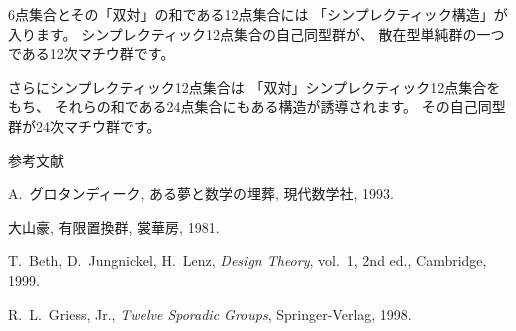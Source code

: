 \documentclass[uplatex,dvipdfmx]{jlreq}
\begin{document}
6点集合とその「双対」の和である12点集合には
「シンプレクティック構造」が入ります。
シンプレクティック12点集合の自己同型群が、
散在型単純群の一つである12次マチウ群です。

さらにシンプレクティック12点集合は
「双対」シンプレクティック12点集合をもち、
それらの和である24点集合にもある構造が誘導されます。
その自己同型群が24次マチウ群です。

\begin{center}\textsc{参考文献}\end{center}
\begin{enumerate}[{[1]}]
  \item A.~グロタンディーク, ある夢と数学の埋葬, 現代数学社, 1993.
  \item 大山豪, 有限置換群, 裳華房, 1981.
  \item T.~Beth, D.~Jungnickel, H.~Lenz,
    \textit{Design Theory}, vol.~1, 2nd ed., Cambridge, 1999.
  \item R.~L.~Griess, Jr.,
    \textit{Twelve Sporadic Groups}, Springer-Verlag, 1998.
\end{enumerate}

\vfill
\end{document}
